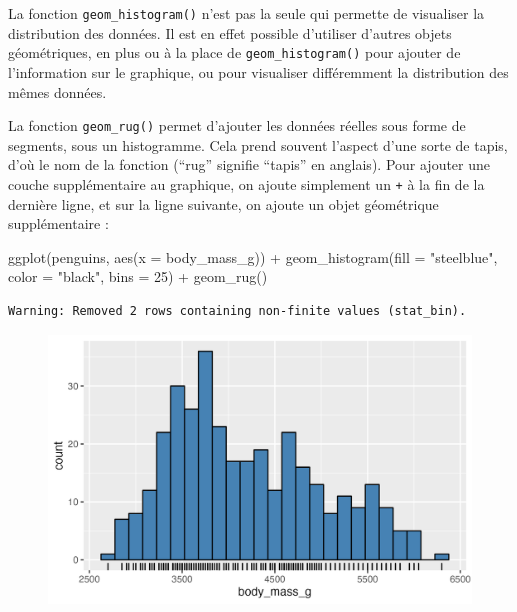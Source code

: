 \documentclass[
  letterpaper,
  DIV=11,
  numbers=noendperiod]{scrreprt}
\newenvironment{Shaded}{\begin{snugshade}}{\end{snugshade}}
\newcommand{\AttributeTok}[1]{\textcolor[rgb]{0.40,0.45,0.13}{#1}}
\newcommand{\DecValTok}[1]{\textcolor[rgb]{0.68,0.00,0.00}{#1}}
\newcommand{\FunctionTok}[1]{\textcolor[rgb]{0.28,0.35,0.67}{#1}}
\newcommand{\NormalTok}[1]{\textcolor[rgb]{0.00,0.23,0.31}{#1}}
\newcommand{\SpecialCharTok}[1]{\textcolor[rgb]{0.37,0.37,0.37}{#1}}
\newcommand{\StringTok}[1]{\textcolor[rgb]{0.13,0.47,0.30}{#1}}
\begin{document}
La fonction \texttt{geom\_histogram()} n'est pas la seule qui permette
de visualiser la distribution des données. Il est en effet possible
d'utiliser d'autres objets géométriques, en plus ou à la place de
\texttt{geom\_histogram()} pour ajouter de l'information sur le
graphique, ou pour visualiser différemment la distribution des mêmes
données.

La fonction \texttt{geom\_rug()} permet d'ajouter les données réelles
sous forme de segments, sous un histogramme. Cela prend souvent l'aspect
d'une sorte de tapis, d'où le nom de la fonction (``rug'' signifie
``tapis'' en anglais). Pour ajouter une couche supplémentaire au
graphique, on ajoute simplement un \texttt{+} à la fin de la dernière
ligne, et sur la ligne suivante, on ajoute un objet géométrique
supplémentaire :

\begin{Shaded}
\begin{Highlighting}[]
\FunctionTok{ggplot}\NormalTok{(penguins, }\FunctionTok{aes}\NormalTok{(}\AttributeTok{x =}\NormalTok{ body\_mass\_g)) }\SpecialCharTok{+}
  \FunctionTok{geom\_histogram}\NormalTok{(}\AttributeTok{fill =} \StringTok{"steelblue"}\NormalTok{, }\AttributeTok{color =} \StringTok{"black"}\NormalTok{,}
                 \AttributeTok{bins =} \DecValTok{25}\NormalTok{) }\SpecialCharTok{+}
  \FunctionTok{geom\_rug}\NormalTok{()}
\end{Highlighting}
\end{Shaded}

\begin{verbatim}
Warning: Removed 2 rows containing non-finite values (stat_bin).
\end{verbatim}

\begin{figure}[H]

{\centering \includegraphics{./03-visualization_files/figure-pdf/unnamed-chunk-20-1.png}

}

\end{figure}
\end{document}
